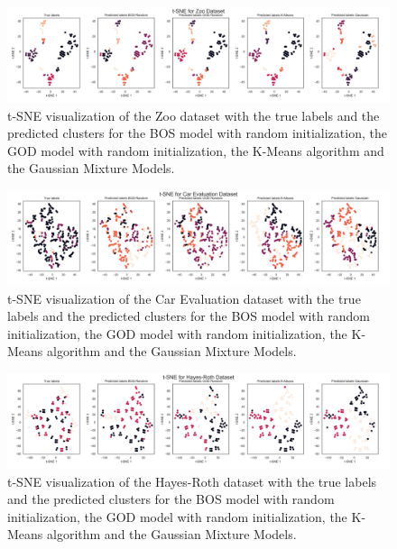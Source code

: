 \begin{figure}[H]
    \centering
    \includegraphics[width=\textwidth]{python_figures/tsne_zoo.png}
    \caption{t-SNE visualization of the Zoo dataset with the true labels and the predicted clusters for the BOS model with random initialization, the GOD model with random initialization, the K-Means algorithm and the Gaussian Mixture Models.}
    \label{fig:tsne_zoo}
\end{figure}

\begin{figure}[H]
    \centering
    \includegraphics[width=\textwidth]{python_figures/tsne_car_evaluation.png}
    \caption{t-SNE visualization of the Car Evaluation dataset with the true labels and the predicted clusters for the BOS model with random initialization, the GOD model with random initialization, the K-Means algorithm and the Gaussian Mixture Models.}
    \label{fig:tsne_car}
\end{figure}

\begin{figure}[H]
    \centering
    \includegraphics[width=\textwidth]{python_figures/tsne_hayes-roth.png}
    \caption{t-SNE visualization of the Hayes-Roth dataset with the true labels and the predicted clusters for the BOS model with random initialization, the GOD model with random initialization, the K-Means algorithm and the Gaussian Mixture Models.}
    \label{fig:tsne_hr}
\end{figure}

